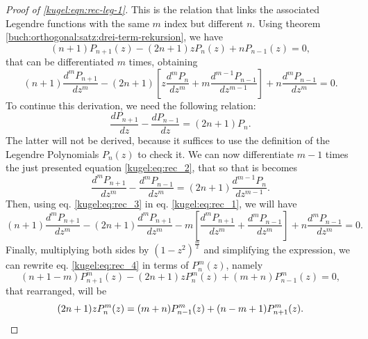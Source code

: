 \begin{proof}[Proof of \eqref{kugel:eqn:rec-leg-1}]
  This is the relation that links the associated Legendre functions with the
  same $m$ index but different $n$. Using theorem
  \ref{buch:orthogonal:satz:drei-term-rekursion}, we have 
  \begin{equation*}
    (n+1)P_{n+1}(z)-(2n+1)zP_n(z)+nP_{n-1}(z)=0,
  \end{equation*}
  that can be differentiated $m$ times, obtaining
  \begin{equation}
    \label{kugel:eq:rec_1}
    (n+1)\frac{d^mP_{n+1}}{dz^m}-(2n+1) \left[
      z \frac{d^m P_n}{dz^m}+ m\frac{d^{m-1}P_{n-1}}{dz^{m-1}}
    \right] + n\frac{d^m P_{n-1}}{dz^m} = 0.
  \end{equation}
  To continue this derivation, we need the following relation:
  \begin{equation}
    \label{kugel:eq:rec_2}
    \frac{dP_{n+1}}{dz} - \frac{dP_{n-1}}{dz} = (2n+1)P_n.
  \end{equation}
  The latter will not be derived, because it suffices to use the definition of
  the Legendre Polynomials $P_n(z)$ to check it.  We can now differentiate $m-1$
  times the just presented equation \eqref{kugel:eq:rec_2}, that so that is
  becomes
  \begin{equation}
    \label{kugel:eq:rec_3}
    \frac{d^mP_{n+1}}{dz^m} - \frac{d^mP_{n-1}}{dz^m}
    = (2n+1)\frac{d^{m-1}P_n}{dz^{m-1}}.
  \end{equation}
  Then, using eq. \eqref{kugel:eq:rec_3} in eq. \eqref{kugel:eq:rec_1}, we will
  have
  \begin{equation}
    \label{kugel:eq:rec_4}
    (n+1)\frac{d^mP_{n+1}}{dz^m}
      - (2n+1)\frac{d^mP_{n+1}}{dz^m}
      - m\left[\frac{d^m P_{n+1}}{dz^m}
      + \frac{d^{m}P_{n-1}}{dz^m}\right]
      + n\frac{d^m P_{n-1}}{dz^m}=0.
  \end{equation}
  Finally, multiplying both sides by $(1-z^2)^{\frac{m}{2}}$ and simplifying the
  expression, we can rewrite eq. \eqref{kugel:eq:rec_4} in terms of $P^m_n(z)$,
  namely
  \begin{equation*}
    (n+1-m)P^m_{n+1}(z)-(2n+1)zP^m_n(z)+(m+n)P^m_{n-1}(z)=0,
  \end{equation*}
  that rearranged, will be
  \begin{equation*}
    (2n+1) z P^m_n(z)= (m+n) P^m_{n-1}(z) + (n-m+1) P^m_{n+1}(z).
    \qedhere
  \end{equation*}
\end{proof}

